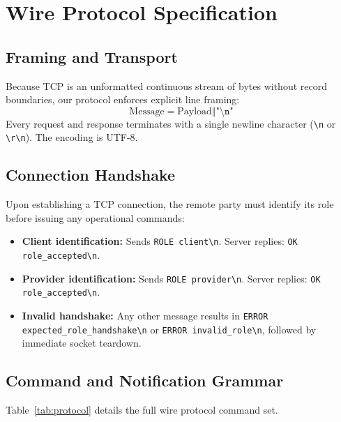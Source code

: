 \documentclass{labreport}
\begin{document}
\newpage

\section{Wire Protocol Specification}

\subsection{Framing and Transport}
Because TCP is an unformatted continuous stream of bytes without record boundaries, our protocol enforces explicit line framing:
\begin{equation}
\text{Message} = \text{Payload} \mathbin{\Vert} \texttt{"\textbackslash n"}
\end{equation}
Every request and response terminates with a single newline character (\texttt{\textbackslash n} or \texttt{\textbackslash r\textbackslash n}). The encoding is UTF-8.

\subsection{Connection Handshake}
Upon establishing a TCP connection, the remote party must identify its role before issuing any operational commands:
\begin{itemize}
    \item \textbf{Client identification:} Sends \texttt{ROLE client\textbackslash n}. Server replies: \texttt{OK role\_accepted\textbackslash n}.
    \item \textbf{Provider identification:} Sends \texttt{ROLE provider\textbackslash n}. Server replies: \texttt{OK role\_accepted\textbackslash n}.
    \item \textbf{Invalid handshake:} Any other message results in \texttt{ERROR expected\_role\_handshake\textbackslash n} or \texttt{ERROR invalid\_role\textbackslash n}, followed by immediate socket teardown.
\end{itemize}

\subsection{Command and Notification Grammar}
Table~\ref{tab:protocol} details the full wire protocol command set.
\end{document}
